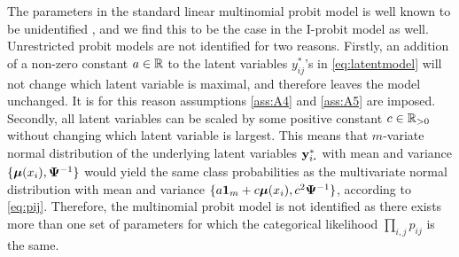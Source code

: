 The parameters in the standard linear multinomial probit model is well known to be unidentified \citep{Keane1992,train2009discrete}, and we find this to be the case in the I-probit model as well.
Unrestricted probit models are not identified for two reasons.
Firstly, an addition of a non-zero constant $a\in\mathbb{R}$ to the latent variables $y_{ij}^*$'s in \cref{eq:latentmodel} will not change which latent variable is maximal, and therefore leaves the model unchanged.
It is for this reason assumptions \ref{ass:A4} and \ref{ass:A5} are imposed.
Secondly, all latent variables can be scaled by some positive constant $c\in\mathbb{R}_{>0}$ without changing which latent variable is largest.
This means that $m$-variate normal distribution of the underlying latent variables $\by_{i\bigcdot}^*$ with mean and variance $\{{\bm\mu}(x_i), {\bm\Psi}^{-1} \}$ would yield the same class probabilities as the multivariate normal distribution with mean and variance $\{a{\mathbf 1}_m + c{\bm\mu}(x_i), c^2{\bm\Psi}^{-1} \}$, according to \cref{eq:pij}.
Therefore, the multinomial probit model is not identified as there exists more than one set of parameters for which the categorical likelihood $\prod_{i,j} p_{ij}$ is the same.

